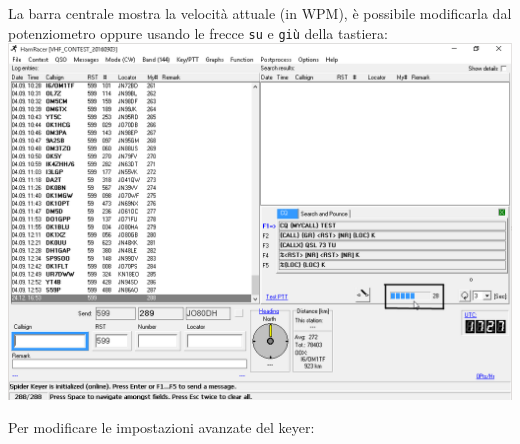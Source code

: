 \begin{samepage}
	\begin{center}
		La barra centrale mostra la velocit\`a attuale (in WPM), \`e possibile modificarla dal potenziometro oppure usando le frecce \texttt{su} e \texttt{gi\`u} della tastiera:
	\includegraphics[width=\linewidth]{./config04.png}
\end{center}
\end{samepage}
\pagebreak
Per modificare le impostazioni avanzate del keyer:
